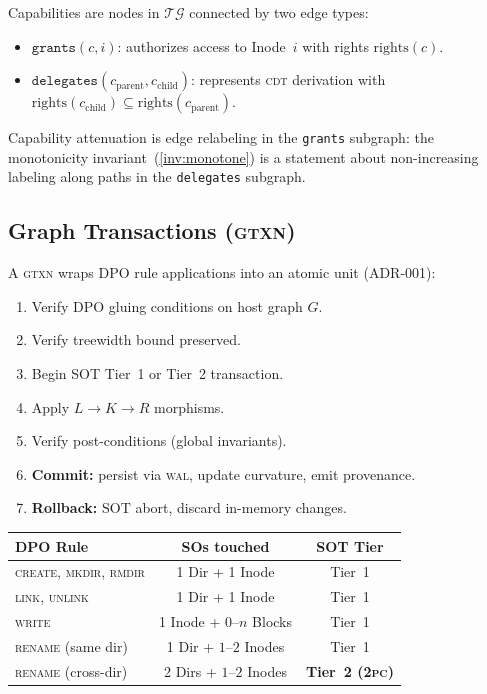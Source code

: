 \documentclass[11pt,a4paper]{article}
\theoremstyle{definition}
\newcommand{\TG}{\ensuremath{\mathcal{TG}}}
\newcommand{\GTXN}{\textsc{gtxn}}
\newcommand{\WAL}{\textsc{wal}}
\newcommand{\CDT}{\textsc{cdt}}
\newcommand{\TPC}{\textsc{2pc}}
\begin{document}
Capabilities are nodes in \TG{} connected by two edge types:
\begin{itemize}[nosep]
  \item $\texttt{grants}(c, i)$: authorizes access to Inode~$i$ with rights
    $\mathrm{rights}(c)$.
  \item $\texttt{delegates}(c_{\mathrm{parent}}, c_{\mathrm{child}})$:
    represents \CDT{} derivation with $\mathrm{rights}(c_{\mathrm{child}})
    \subseteq \mathrm{rights}(c_{\mathrm{parent}})$.
\end{itemize}

Capability attenuation is edge relabeling in the \texttt{grants} subgraph:
the monotonicity invariant~(\ref{inv:monotone}) is a statement about
non-increasing labeling along paths in the \texttt{delegates} subgraph.

\subsection{Graph Transactions (\GTXN{})}

A \GTXN{} wraps DPO rule applications into an atomic unit (ADR-001):

\begin{enumerate}[nosep]
  \item Verify DPO gluing conditions on host graph $G$.
  \item Verify treewidth bound preserved.
  \item Begin SOT Tier~1 or Tier~2 transaction.
  \item Apply $L \to K \to R$ morphisms.
  \item Verify post-conditions (global invariants).
  \item \textbf{Commit:} persist via \WAL{}, update curvature, emit provenance.
  \item \textbf{Rollback:} SOT abort, discard in-memory changes.
\end{enumerate}

\begin{center}
\footnotesize
\begin{tabular}{lcc}
\toprule
\textbf{DPO Rule} & \textbf{SOs touched} & \textbf{SOT Tier} \\
\midrule
\textsc{create}, \textsc{mkdir}, \textsc{rmdir} & 1 Dir + 1 Inode & Tier~1 \\
\textsc{link}, \textsc{unlink} & 1 Dir + 1 Inode & Tier~1 \\
\textsc{write} & 1 Inode + $0$--$n$ Blocks & Tier~1 \\
\textsc{rename} (same dir) & 1 Dir + $1$--$2$ Inodes & Tier~1 \\
\textsc{rename} (cross-dir) & 2 Dirs + $1$--$2$ Inodes & \textbf{Tier~2 (\TPC{})} \\
\bottomrule
\end{tabular}
\end{center}
\end{document}
